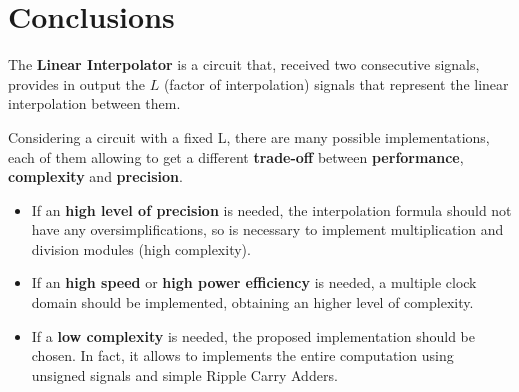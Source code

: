 \section{Conclusions}

The \textbf{Linear Interpolator} is a circuit that, received two consecutive signals, provides in output the $L$ (factor of interpolation) signals that represent the linear interpolation between them.

Considering a circuit with a fixed L, there are many possible implementations, each of them allowing to get a different \textbf{trade-off} between \textbf{performance}, \textbf{complexity} and \textbf{precision}.

\begin{itemize}
    \item If an \textbf{high level of precision} is needed, the interpolation formula should not have any oversimplifications, so is necessary to implement multiplication and division modules (high complexity).
    \item If an \textbf{high speed} or \textbf{high power efficiency} is needed, a multiple clock domain should be implemented, obtaining an higher level of complexity.
    \item If a \textbf{low complexity} is needed, the proposed implementation should be chosen. In fact, it allows to implements the entire computation using unsigned signals and simple Ripple Carry Adders.
\end{itemize}